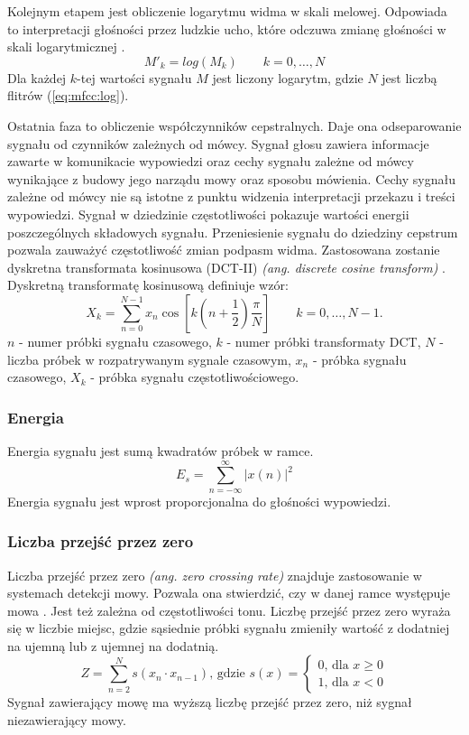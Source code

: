 \documentclass[a4paper,12pt,twoside,openany]{report}
\newcommand{\ang}[1]{\textit{(ang. #1)}}
\newcommand{\Eq}[1]{(\ref{#1})}
\begin{document}
Kolejnym etapem jest obliczenie logarytmu widma w skali melowej.
Odpowiada to interpretacji głośności przez ludzkie ucho,
które odczuwa zmianę głośności w skali logarytmicznej \cite{Hossan2013}.
\begin{equation}
	M'_k=log(M_k)\qquad k=0, \dots, N
	\label{eq:mfcc:log}
\end{equation}
Dla każdej $k$-tej wartości sygnału $M$ jest liczony logarytm, gdzie $N$ jest liczbą flitrów \Eq{eq:mfcc:log}.

Ostatnia faza to obliczenie współczynników cepstralnych.
Daje ona odseparowanie sygnału od czynników zależnych od mówcy.
Sygnał głosu zawiera informacje zawarte w komunikacie wypowiedzi oraz 
cechy sygnału zależne od mówcy wynikające z budowy jego narządu mowy oraz sposobu mówienia.
Cechy sygnału zależne od mówcy nie są istotne z punktu widzenia interpretacji przekazu i treści wypowiedzi.
Sygnał w dziedzinie częstotliwości pokazuje wartości energii poszczególnych składowych sygnału.
Przeniesienie sygnału do dziedziny cepstrum pozwala zauważyć częstotliwość zmian podpasm widma.
Zastosowana zostanie dyskretna transformata kosinusowa (DCT-II) \ang{discrete cosine transform} \cite{Hossan2013}.
Dyskretną transformatę kosinusową definiuje wzór:
\begin{equation}
	X_k =
	 \sum_{n=0}^{N-1} x_n \cos \left[k \left(n+\frac{1}{2}\right) \frac{\pi}{N} \right] \quad \quad k = 0, \dots, N-1.
\end{equation}
$n$ - numer próbki sygnału czasowego,
$k$ - numer próbki transformaty DCT,
$N$ - liczba próbek w rozpatrywanym sygnale czasowym,
$x_n$ - próbka sygnału czasowego,
$X_k$ - próbka sygnału częstotliwościowego.


\subsubsection{Energia}
Energia sygnału jest sumą kwadratów próbek w ramce.
\begin{equation}
	E_{s}=\sum _{n=-\infty }^{\infty }{|x(n)|^{2}}
	\label{eq:energy}
\end{equation}
Energia sygnału jest wprost proporcjonalna do głośności wypowiedzi.
\subsubsection{Liczba przejść przez zero}
Liczba przejść przez zero \ang{zero crossing rate} znajduje zastosowanie w systemach detekcji mowy.
Pozwala ona stwierdzić, czy w danej ramce występuje mowa \cite{Walters-Williams2010}.
Jest też zależna od częstotliwości tonu. 
Liczbę przejść przez zero wyraża się w liczbie miejsc, gdzie sąsiednie próbki sygnału zmieniły wartość z dodatniej na ujemną lub z ujemnej na dodatnią.
\begin{equation}
	Z = \sum_{n=2}^{N}s(x_n \cdot x_{n-1})\text{, gdzie } s(x) = 
	\begin{cases} 
		0 \text{, dla } x \geq 0 \\
		1 \text{, dla } x < 0
	\end{cases}
	\label{eq:zcr}
\end{equation}
Sygnał zawierający mowę ma wyższą liczbę przejść przez zero, niż sygnał niezawierający mowy\cite{Walters-Williams2010}.
\end{document}
